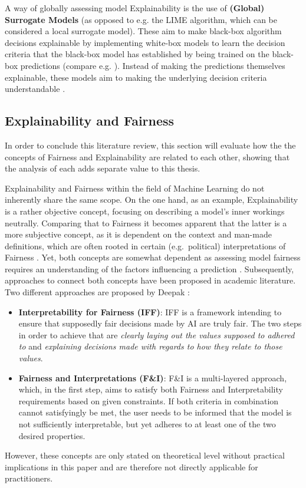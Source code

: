 A way of globally assessing model Explainability is the use of \textbf{(Global) Surrogate Models} (as opposed to e.g. the LIME algorithm, which can be considered a local surrogate model). 
These aim to make black-box algorithm decisions explainable by implementing white-box models to learn the decision criteria that the black-box model has established by being trained on the black-box predictions (compare e.g. \cite{Karim2023}).
Instead of making the predictions themselves explainable, these models aim to making the underlying decision criteria understandable \parencite{Molnar2023}.

\subsection{Explainability and Fairness}\label{subsec:explainability_fairness}

In order to conclude this literature review, this section will evaluate how the the concepts of Fairness and Explainability are related to each other, showing that the analysis of each adds separate value to this thesis.

Explainability and Fairness within the field of Machine Learning do not inherently share the same scope. On the one hand, as an example, Explainability is a rather objective concept, focusing on describing a model's inner workings neutrally. 
Comparing that to Fairness it becomes apparent that the latter is a more subjective concept, as it is dependent on the context and man-made definitions, which are often rooted in certain (e.g.\ political) interpretations of Fairness \parencite{Deepak2021}.
Yet, both concepts are somewhat dependent as assessing model fairness requires an understanding of the factors influencing a prediction \parencite{Zhou2022}.
Subsequently, approaches to connect both concepts have been proposed in academic literature. Two different approaches are proposed by Deepak \parencite{Deepak2021}: 
\begin{itemize}
    \item \textbf{Interpretability for Fairness (IFF)}: IFF is a framework intending to ensure that supposedly fair decisions made by AI are truly fair. The two steps in order to achieve that are \textit{clearly laying out the values supposed to adhered to} and \textit{explaining decisions made with regards to how they relate to those values}.
    \item \textbf{Fairness and Interpretations (F\&I)}: F\&I is a multi-layered approach, which, in the first step, aims to satisfy both Fairness and Interpretability requirements based on given constraints. If both criteria in combination cannot satisfyingly be met, the user needs to be informed that the model is not sufficiently interpretable, but yet adheres to at least one of the two desired properties.
\end{itemize}
However, these concepts are only stated on theoretical level without practical implications in this paper and are therefore not directly applicable for practitioners.


